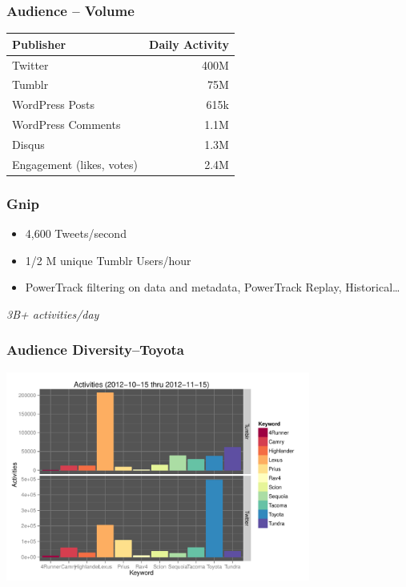 \documentclass{beamer}
\begin{document}

\begin{frame} \frametitle{Audience -- Volume}
\begin{table}
\begin{tabular}{l|r}
\hline
   {Publisher}   &   {Daily Activity}   \\ [1pt]
\hline 
    Twitter      &      400M   \\
    Tumblr      &        75M   \\
    WordPress Posts &     615k   \\
    WordPress Comments & 1.1M \\
    Disqus       &       1.3M  \\
    Engagement (likes, votes) & 2.4M  \\
\hline
\end{tabular}
\end{table}
\end{frame}

\begin{frame}\frametitle{Gnip}
\Large{
\begin{itemize}
\item 4,600 Tweets/second \\ [2pt]
\item 1/2 M unique Tumblr Users/hour \\  [2pt]
\item PowerTrack filtering on data and metadata, PowerTrack Replay, Historical\ldots \\  [15pt]
\end{itemize}
}
\begin{center}
\Huge{\emph{3B+ activities/day}}
\end{center}
\end{frame}


\begin{frame}\frametitle{Audience Diversity--Toyota}
  \begin{center}
    \includegraphics[width=10cm]{./imgs/bars_twitter_tumblr.pdf}
  \end{center}
\end{frame}
\end{document}
